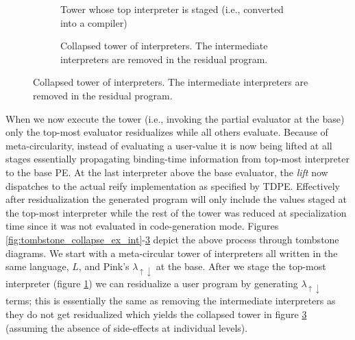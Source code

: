 \documentclass[a4paper,12pt,twoside,openright]{report}
\theoremstyle{definition}
\newcommand{\mslang}{$\lambda_{\uparrow\downarrow}$}
\begin{document}
\begin{figure}
\begin{subfigure}{.5\linewidth}
    \caption{Tower whose top interpreter is staged (i.e., converted into a compiler)}
    \label{fig:tombstone_collapse_ex_comp}
    \end{subfigure}
    \begin{subfigure}{\linewidth}
    \centering
    \caption{Collapsed tower of interpreters. The intermediate interpreters are removed in the residual program.}
    \label{fig:tombstone_collapsed}
    \end{subfigure}
\end{figure}

When we now execute the tower (i.e., invoking the partial evaluator at the base) only the top-most evaluator residualizes while all others evaluate. Because of meta-circularity, instead of evaluating a user-value it is now being lifted at all stages essentially propagating binding-time information from top-most interpreter to the base PE. At the last interpreter above the base evaluator, the \textit{lift} now dispatches to the actual reify implementation as specified by TDPE. Effectively after residualization the generated program will only include the values staged at the top-most interpreter while the rest of the tower was reduced at specialization time since it was not evaluated in code-generation mode. Figures \ref{fig:tombstone_collapse_ex_int}-\ref{fig:tombstone_collapsed} depict the above process through tombstone diagrams. We start with a meta-circular tower of interpreters all written in the same language, $L$, and Pink's \mslang{} at the base. After we stage the top-most interpreter (figure \ref{fig:tombstone_collapse_ex_comp}) we can residualize a user program by generating \mslang{} terms; this is essentially the same as removing the intermediate interpreters as they do not get residualized which yields the collapsed tower in figure \ref{fig:tombstone_collapsed} (assuming the absence of side-effects at individual levels).
\end{document}
